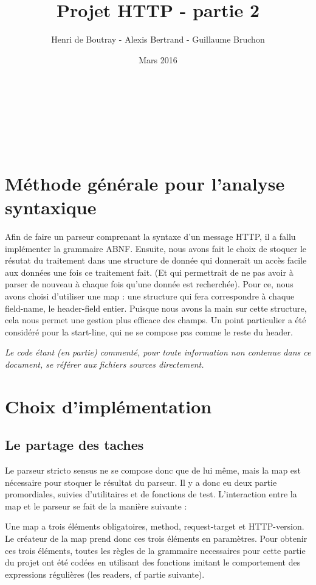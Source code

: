 \documentclass{article}
\title{Projet HTTP - partie 2}
\author{Henri de Boutray - Alexis Bertrand - Guillaume Bruchon}
\date{Mars 2016}
\begin{document}
\maketitle
~~\\
~~\\
~~\\
~~\\
\tableofcontents
\newpage
    \section{Méthode générale pour l'analyse syntaxique} %
    
        Afin de faire un parseur comprenant la syntaxe d'un message HTTP, il a fallu implémenter la grammaire ABNF. Ensuite, nous avons fait le choix de stoquer le résutat du traitement dans une structure de donnée qui donnerait un accès facile aux données une fois ce traitement fait. (Et qui permettrait de ne pas avoir à parser de nouveau à chaque fois qu'une donnée est recherchée). Pour ce, nous avons choisi d'utiliser une map : une structure qui fera correspondre à chaque field-name, le header-field entier. Puisque nous avons la main sur cette structure, cela nous permet une gestion plus efficace des champs. Un point particulier a été considéré pour la start-line, qui ne se compose pas comme le reste du header.
        
        \emph{Le code étant (en partie) commenté, pour toute information non contenue dans ce document, se référer aux fichiers sources directement.}
    
    \section{Choix d'implémentation}
    
        \subsection{Le partage des taches} %
        
        Le parseur stricto sensus ne se compose donc que de lui même, mais la map est nécessaire pour stoquer le résultat du parseur. Il y a donc eu deux partie promordiales, suivies d'utilitaires et de fonctions de test. L'interaction entre la map et le parseur se fait de la manière suivante :
        
        Une map a trois éléments obligatoires, method, request-target et HTTP-version. Le créateur de la map prend donc ces trois éléments en paramètres. Pour obtenir ces trois éléments, toutes les règles de la grammaire necessaires pour cette partie du projet ont été codées en utilisant des fonctions imitant le comportement des expressions régulières (les readers, cf partie suivante). 
        
\end{document}
